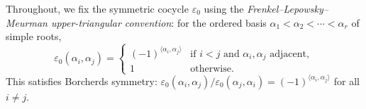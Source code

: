 Throughout, we fix the symmetric cocycle $\varepsilon_0$ using the
\emph{Frenkel--Lepowsky--Meurman upper-triangular convention}: for
the ordered basis $\alpha_1 < \alpha_2 < \cdots < \alpha_r$ of
simple roots,
\begin{equation}\label{eq:lattice:flm-cocycle}
\varepsilon_0(\alpha_i, \alpha_j)
=
\begin{cases}
(-1)^{\langle\alpha_i,\alpha_j\rangle} & \text{if } i < j
 \text{ and $\alpha_i, \alpha_j$ adjacent}, \\
1 & \text{otherwise}.
\end{cases}
\end{equation}
This satisfies Borcherds symmetry:
$\varepsilon_0(\alpha_i,\alpha_j)/\varepsilon_0(\alpha_j,\alpha_i)
= (-1)^{\langle\alpha_i,\alpha_j\rangle}$ for all $i \neq j$.



